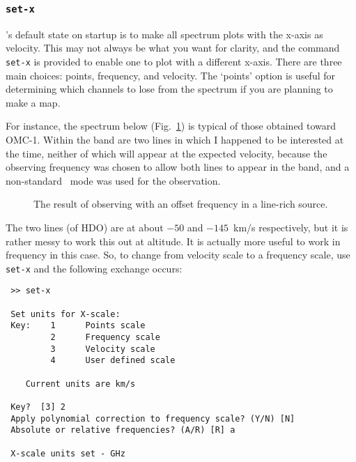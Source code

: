 \subsubsection{{\tt set-x}}
\label{sec:set-x}
\SPECX 's default state on startup is to make all spectrum plots with
the x-axis as velocity. This may not always be what you want for
clarity, and the command {\tt set-x} is provided to enable one to plot
with a different x-axis. There are three main choices: points,
frequency, and velocity. The `points' option is useful for determining
which channels to lose from the spectrum if you are planning to make a
map. 

For instance, the spectrum below (Fig.~\ref{fig:set-x-orig}) 
is typical of those obtained toward
OMC-1. Within the band are two lines in which I happened to be
interested at the time, neither of which will appear at the expected
velocity, because the observing frequency was chosen to allow both
lines to appear in the band, and a non-standard \das\ mode was used
for the observation.

\begin{figure}[ht]
\begin{minipage}[t]{\textwidth}
\begin{minipage}[b]{0.5\textwidth}
\leavevmode
\centering
\epsfxsize=2.3in
\end{minipage}
\hfill
\begin{minipage}[b]{0.45\textwidth}
\caption[A messy spectrum]
{\small{The result of observing with an offset frequency in a
line-rich source.
\vspace*{2cm}
}}
\label{fig:set-x-orig}
\end{minipage}
\end{minipage}
\end{figure}

The two lines (of HDO) are at about $-50$ and $-145$~km/s
respectively, but it is rather messy to work this out at altitude.  It
is actually more useful to work in frequency in this case. So, 
to change from velocity scale to a frequency scale, use {\tt set-x}
and the following exchange occurs: 

\begin{verbatim}
 >> set-x
 
 Set units for X-scale:
 Key:    1      Points scale
         2      Frequency scale
         3      Velocity scale
         4      User defined scale
 
    Current units are km/s  
 
 Key?  [3] 2
 Apply polynomial correction to frequency scale? (Y/N) [N] 
 Absolute or relative frequencies? (A/R) [R] a
 
 X-scale units set - GHz 
\end{verbatim} 

